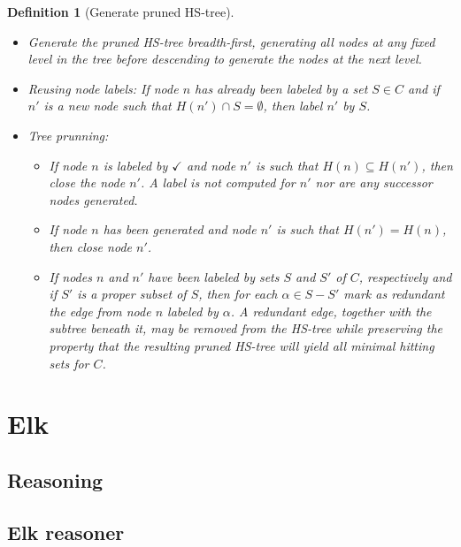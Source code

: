 \documentclass[12pt,a4paper]{article}
\newtheorem{definition}{Definition}[subsection]
\begin{document}
\begin{definition}[Generate pruned HS-tree]{\indent}
	\begin{itemize}
		\item Generate the pruned HS-tree breadth-first, generating all nodes at any fixed level in the tree before descending to generate the nodes at the next level.
		
		\item Reusing node labels: If node $n$ has already been labeled by a set $S \in C$ and if $n'$ is a new node such that $H(n') \cap S = \emptyset$, then label $n'$ by $S$.
		
		\item Tree prunning:
		
		\begin{itemize}
			\item If node $n$ is labeled by $\checkmark$ and node $n'$ is such that $H(n) \subseteq H(n')$, then close the node $n'$. A label is not computed for $n'$ nor are any successor nodes generated.
			
			\item If node $n$ has been generated and node $n'$ is such that $H(n') = H(n)$, then close node $n'$.
			
			\item If nodes $n$ and $n'$ have been labeled by sets $S$ and $S'$ of $C$, respectively and if $S'$ is a proper subset of $S$, then for each $\alpha \in S - S'$ mark as redundant the edge from node $n$ labeled by $\alpha$. A redundant edge, together with the subtree beneath it, may be removed from the HS-tree while preserving the property that the resulting pruned HS-tree will yield all minimal hitting sets for $C$.
			
		\end{itemize}	
		
	\end{itemize}

\end{definition}

\section{Elk}

\subsection{Reasoning}

\subsection{Elk reasoner}
\end{document}
